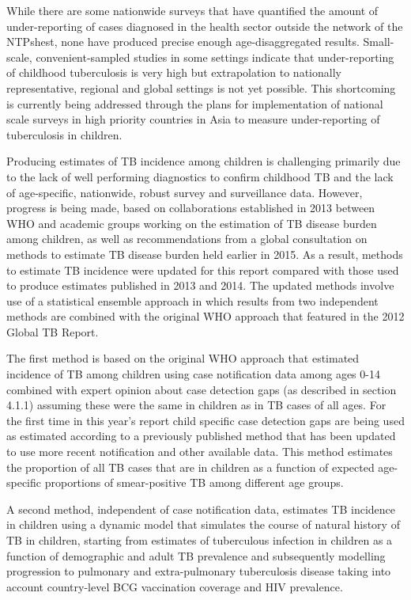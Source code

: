 While there are some nationwide surveys that have quantified the amount of under-reporting of cases diagnosed in the health sector outside the network of the NTPs\cite{20487611}\cite{17156496}hest\cite{18346285}, none have produced precise enough age-disaggregated results. Small-scale, convenient-sampled studies in some settings indicate that under-reporting of childhood tuberculosis is very high\cite{21985569}\cite{Coghlan2015-xn} but extrapolation to nationally representative, regional and global settings is not yet possible. This shortcoming is currently being addressed through the plans for implementation of national scale surveys in high priority countries in Asia to measure under-reporting of tuberculosis in children\cite{noauthor_2014-gv}.

Producing estimates of TB incidence among children is challenging primarily due to the lack of well performing diagnostics to confirm childhood TB and the lack of age-specific, nationwide, robust survey and surveillance data. However, progress is being made, based on collaborations established in 2013 between WHO and academic groups working on the estimation of TB disease burden among children, as well as recommendations from a global consultation on methods to estimate TB disease burden held earlier in 2015. As a result, methods to estimate TB incidence were updated for this report compared with those used to produce estimates published in 2013 and 2014. The updated methods involve use of a statistical ensemble approach in which results from two independent methods are combined with the original WHO approach that featured in the 2012 Global TB Report. 

The first method is based on the original WHO approach that estimated incidence of TB among children using case notification data among ages 0-14 combined with expert opinion about case detection gaps (as described in section 4.1.1) assuming these were the same in children as in TB cases of all ages. For the first time in this year’s report child specific case detection gaps are being used as estimated according to a previously published method\cite{Jenkins_2014} that has been updated to use more recent notification and other available data\cite{Sismanidis_2014}. This method estimates the proportion of all TB cases that are in children as a function of expected age-specific proportions of smear-positive TB among different age groups. 

A second method, independent of case notification data, estimates TB incidence in children using a dynamic model that simulates the course of natural history of TB in children, starting from estimates of tuberculous infection in children as a function of demographic and adult TB prevalence and subsequently modelling progression to pulmonary and extra-pulmonary tuberculosis disease taking into account country-level BCG vaccination coverage and HIV prevalence\cite{Dodd_2014}. 

